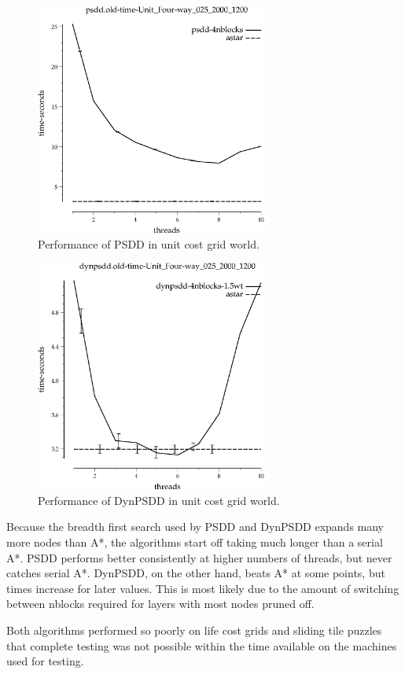 \documentclass{article}
\begin{document}
\begin{figure}[h!]
\includegraphics[width=3in]{../graphs/seth/grid-unit-single/PSDD.eps}
\caption{Performance of PSDD in unit cost grid world.}
\label{fig:PSDD-grid}
\end{figure}

\begin{figure}[h!]
\includegraphics[width=3in]{../graphs/seth/grid-unit-single/DynPSDD.eps}
\caption{Performance of DynPSDD in unit cost grid world.}
\label{fig:DynPSDD-grid}
\end{figure}

Because the breadth first search used by PSDD and DynPSDD expands many more nodes than A*, the algorithms start off taking much longer than a serial A*. PSDD performs better consistently at higher numbers of threads, but never catches serial A*. DynPSDD, on the other hand, beats A* at some points, but times increase for later values. This is most likely due to the amount of switching between nblocks required for layers with most nodes pruned off.

Both algorithms performed so poorly on life cost grids and sliding tile puzzles that complete testing was not possible within the time available on the machines used for testing.
\end{document}
